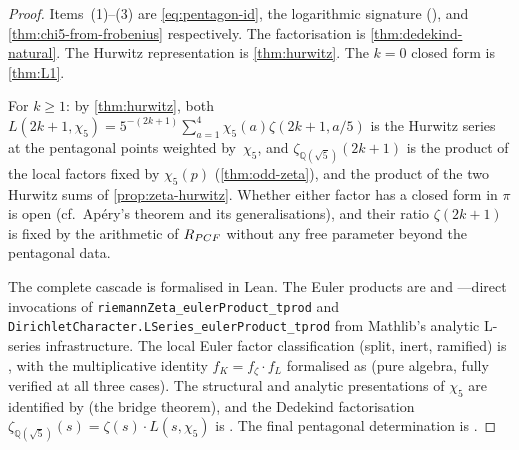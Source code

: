 \begin{proof}
Items~(1)--(3) are \cref{eq:pentagon-id}, the logarithmic signature
(), and \cref{thm:chi5-from-frobenius}
respectively.  The factorisation is
\cref{thm:dedekind-natural}.  The Hurwitz representation is
\cref{thm:hurwitz}.  The $k=0$ closed form is
\cref{thm:L1}.

For $k\geq 1$: by \cref{thm:hurwitz}, both
$L(2k+1,\chi_5) = 5^{-(2k+1)}\sum_{a=1}^{4}\chi_5(a)\zeta(2k+1,a/5)$
is the Hurwitz series at the pentagonal points weighted by~$\chi_5$, and
$\zeta_{\mathbb{Q}(\sqrt{5})}(2k+1)$ is the product of the local factors fixed by
$\chi_5(p)$ (\cref{thm:odd-zeta}), and the product of the two Hurwitz sums of \cref{prop:zeta-hurwitz}.  Whether
either factor has a closed form in $\pi$ is open (cf.\ Ap\'ery's theorem and its generalisations), and
their ratio $\zeta(2k+1)$ is fixed by the arithmetic of $R_{PCF}$
without any free parameter beyond the pentagonal data.

The complete cascade is formalised in Lean.  The Euler products are
 and ---direct
invocations of \texttt{riemannZeta\_eulerProduct\_tprod} and
\texttt{DirichletCharacter.LSeries\_eulerProduct\_tprod} from
Mathlib's analytic L-series infrastructure.  The local Euler factor
classification (split, inert, ramified) is , with the
multiplicative identity $f_K = f_\zeta \cdot f_L$ formalised as
 (pure algebra, fully verified at all
three cases).  The structural and analytic presentations of $\chi_5$
are identified by  (the bridge
theorem), and the Dedekind factorisation
$\zeta_{\mathbb{Q}(\sqrt{5})}(s) = \zeta(s)\cdot L(s,\chi_5)$ is
.  The final pentagonal determination
is .
\end{proof}

